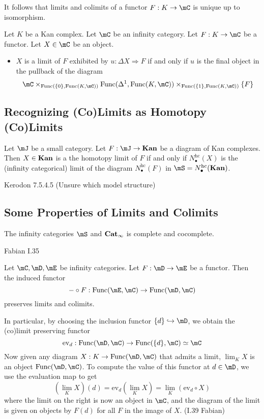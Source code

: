 \documentclass[a4paper]{article}
\begin{document}
It follows that limits and colimits of a functor $F:K\to\mC$ is unique up to isomorphism. 

\begin{prp}{}{} Let $K$ be a Kan complex. Let $\mC$ be an infinity category. Let $F:K\to\mC$ be a functor. Let $X\in\mC$ be an object. 
\begin{itemize}
\item $X$ is a limit of $F$ exhibited by $u:\Delta X\Rightarrow F$ if and only if $u$ is the final object in the pullback of the diagram $$\mC\times_{\text{Func}(\{0\},\text{Func}(K,\mC))}\text{Func}(\Delta^1,\text{Func}(K,\mC))\times_{\text{Func}(\{1\},\text{Func}(K,\mC))}\{F\}$$
\end{itemize}
\end{prp}

\subsection{Recognizing (Co)Limits as Homotopy (Co)Limits}
\begin{prp}{}{} Let $\mJ$ be a small category. Let $F:\mJ\to\bold{Kan}$ be a diagram of Kan complexes. Then $X\in\bold{Kan}$ is a the homotopy limit of $F$ if and only if $N_\bullet^\text{hc}(X)$ is the (infinity categorical) limit of the diagram $N_\bullet^\text{hc}(F)$ in $\mS=N_\bullet^\text{hc}(\bold{Kan})$. 
\end{prp}

Kerodon 7.5.4.5 (Unsure which model structure)

\subsection{Some Properties of Limits and Colimits}
\begin{prp}{}{} The infinity categories $\mS$ and $\bold{Cat}_\infty$ is complete and cocomplete. 
\end{prp}

Fabian I.35

\begin{prp}{}{} Let $\mC,\mD,\mE$ be infinity categories. Let $F:\mD\to\mE$ be a functor. Then the induced functor $$-\circ F:\text{Func}(\mE,\mC)\to\text{Func}(\mD,\mC)$$ preserves limits and colimits. 
\end{prp}

In particular, by choosing the inclusion functor $\{d\}\hookrightarrow\mD$, we obtain the (co)limit preserving functor $$\text{ev}_d:\text{Func}(\mD,\mC)\to\text{Func}(\{d\},\mC)\simeq\mC$$ Now given any diagram $X:K\to\text{Func}(\mD,\mC)$ that admits a limit, $\lim_K X$ is an object $\text{Func}(\mD,\mC)$. To compute the value of this functor at $d\in\mD$, we use the evaluation map to get $$\left(\lim_K X\right)(d)=\text{ev}_d\left(\lim_KX\right)=\lim_K(\text{ev}_d\circ X)$$ where the limit on the right is now an object in $\mC$, and the diagram of the limit is given on objects by $F(d)$ for all $F$ in the image of $X$. (I.39 Fabian)
\end{document}
